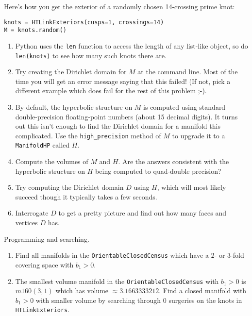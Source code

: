 \documentclass[tikz, a4paper]{nmd/hw}
\begin{document}
\begin{problems}
  \item Here's how you get the exterior of a randomly chosen 14-crossing prime knot:

  \texttt{knots = HTLinkExteriors(cusps=1, crossings=14)} \\ 
  \texttt{M = knots.random()}

  \begin{enumerate}
    \item Python uses the \texttt{len} function to access the length of any
      list-like object, so do \texttt{len(knots)} to see how many such
      knots there are.

    \item Try creating the Dirichlet domain for $M$ at the command
      line.  Most of the time you will get an error message saying
      that this failed!  (If not, pick a different example which does
      fail for the rest of this problem ;-).

    \item By default, the hyperbolic structure on $M$ is computed
      using standard double-precision floating-point numbers (about 15
      decimal digits).  It turns out this isn't enough to find the
      Dirichlet domain for a manifold this complicated.  Use the
      \texttt{high\_precision} method of $M$ to upgrade it to a
      \texttt{ManifoldHP} called $H$. 

    \item Compute the volumes of $M$ and $H$.  Are the answers
      consistent with the hyperbolic structure on $H$ being computed
      to quad-double precision?

    \item Try computing the Dirichlet domain $D$ using $H$, which
      will most likely succeed though it typically takes a few
      seconds. 

    \item Interrogate $D$ to get a pretty picture and find out how
      many faces and vertices $D$ has. 

    \end{enumerate}
    
  
  \item Programming and searching.
    \begin{enumerate}
      \item Find all manifolds in the \texttt{OrientableClosedCensus}
        which have a 2- or 3-fold covering space with $b_1 > 0$.  
      \item The smallest volume manifold in the
        \texttt{OrientableClosedCensus} with $b_1 > 0$ is $m160(3,1)$
        which has volume $\approx 3.1663333212$.  Find a closed
        manifold with $b_1 > 0$ with smaller volume by searching
        through 0 surgeries on the knots in \texttt{HTLinkExteriors}.  


\end{enumerate}
\end{problems}
\end{document}
